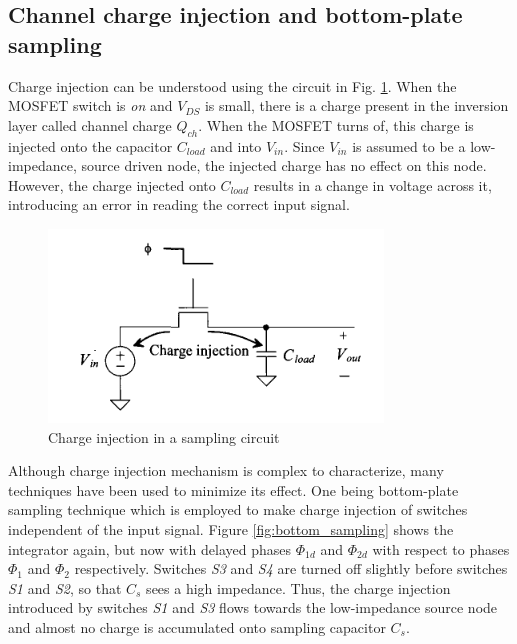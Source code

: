 \subsection{Channel charge injection and bottom-plate sampling}
Charge injection can be understood using the circuit in Fig. \ref{fig:charge_injection}. When the MOSFET switch is \textit{on} and $V_{DS}$ is small, there is a charge present in the inversion layer called channel charge $Q_{ch}$. When the MOSFET turns of, this charge is injected onto the capacitor $C_{load}$ and into $V_{in}$. Since $V_{in}$ is assumed to be a low-impedance, source driven node, the injected charge has no effect on this node. However, the charge injected onto $C_{load}$ results in a change in voltage across it, introducing an error in reading the correct input signal. 

\begin{figure}[H]
\centering
\includegraphics[scale=0.9]{images/charge_injection.png}
\caption{Charge injection in a sampling circuit}
\label{fig:charge_injection}
\end{figure}

Although charge injection mechanism is complex to characterize, many techniques have been used to minimize its effect. One being bottom-plate sampling technique\cite{Barker} which is employed to make charge injection of switches independent of the input signal. Figure \ref{fig:bottom_sampling} shows the integrator again, but now with delayed phases $\Phi_{1d}$ and $\Phi_{2d}$ with respect to phases $\Phi_1$ and $\Phi_2$ respectively. Switches \textit{S3} and \textit{S4} are turned off slightly before switches \textit{S1} and \textit{S2}, so that $C_s$ sees a high impedance. Thus, the charge injection introduced by switches \textit{S1} and \textit{S3} flows towards the low-impedance source node and almost no charge is accumulated onto sampling capacitor $C_s$.

